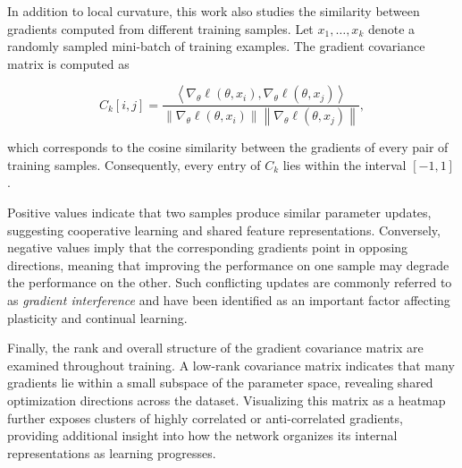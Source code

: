 In addition to local curvature, this work also studies the similarity between gradients computed from different training samples. Let $x_1,\ldots,x_k$ denote a randomly sampled mini-batch of training examples. The gradient covariance matrix is computed as

\begin{equation}
C_k[i,j]
=
\frac{
\left\langle
\nabla_{\theta}\ell(\theta,x_i),
\nabla_{\theta}\ell(\theta,x_j)
\right\rangle
}{
\left\|
\nabla_{\theta}\ell(\theta,x_i)
\right\|
\left\|
\nabla_{\theta}\ell(\theta,x_j)
\right\|
},
\end{equation}

which corresponds to the cosine similarity between the gradients of every pair of training samples. Consequently, every entry of $C_k$ lies within the interval $[-1,1]$.

Positive values indicate that two samples produce similar parameter updates, suggesting cooperative learning and shared feature representations. Conversely, negative values imply that the corresponding gradients point in opposing directions, meaning that improving the performance on one sample may degrade the performance on the other. Such conflicting updates are commonly referred to as \emph{gradient interference} and have been identified as an important factor affecting plasticity and continual learning.

Finally, the rank and overall structure of the gradient covariance matrix are examined throughout training. A low-rank covariance matrix indicates that many gradients lie within a small subspace of the parameter space, revealing shared optimization directions across the dataset. Visualizing this matrix as a heatmap further exposes clusters of highly correlated or anti-correlated gradients, providing additional insight into how the network organizes its internal representations as learning progresses.





